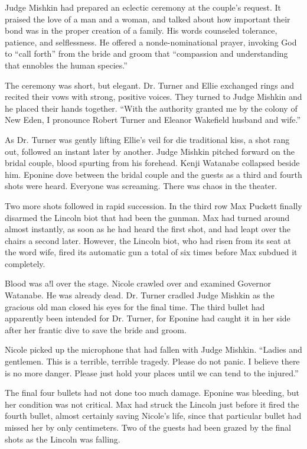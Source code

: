 \documentclass[]{article}
\begin{document}
{Judge Mishkin had prepared an eclectic ceremony at the couple’s request.  It praised the love of a man and a woman, and talked about how important their bond was in the proper creation of a family.  His words counseled tolerance, patience, and selflessness.  He offered a nonde-nominational prayer, invoking God to “call forth” from the bride and groom that “compassion and understanding that ennobles the human species.”

The ceremony was short, but elegant.  Dr.  Turner and Ellie exchanged rings and recited their vows with strong, positive voices.  They turned to Judge Mishkin and he placed their hands together.  “With the authority granted me by the colony of New Eden, I pronounce Robert Turner and Eleanor Wakefield husband and wife.”

As Dr.  Turner was gently lifting Ellie’s veil for die traditional kiss, a shot rang out, followed an instant later by another.  Judge Mishkin pitched forward on the bridal couple, blood spurting from his forehead.  Kenji Watanabe collapsed beside him.  Eponine dove between the bridal couple and the guests as a third and fourth shots were heard.  Everyone was screaming.  There was chaos in the theater.

Two more shots followed in rapid succession.  In the third row Max Puckett finally disarmed the Lincoln biot that had been the gunman.  Max had turned around almost instantly, as soon as he had heard the first shot, and had leapt over the chairs a second later.  However, the Lincoln biot, who had risen from its seat at the word wife, fired its automatic gun a total of six times before Max subdued it completely.

Blood was a!l over the stage.  Nicole crawled over and examined Governor Watanabe.  He was already dead.  Dr.  Turner cradled Judge Mishkin as the gracious old man closed his eyes for the final time.  The third bullet had apparently been intended for Dr.  Turner, for Eponine had caught it in her side after her frantic dive to save the bride and groom.

Nicole picked up the microphone that had fallen with Judge Mishkin.  “Ladies and gentlemen.  This is a terrible, terrible tragedy.  Please do not panic.  I believe there is no more danger.  Please just hold your places until we can tend to the injured.”

The final four bullets had not done too much damage.  Eponine was bleeding, but her condition was not critical.  Max had struck the Lincoln just before it fired the fourth bullet, almost certainly saving Nicole’s life, since that particular bullet had missed her by only centimeters.  Two of the guests had been grazed by the final shots as the Lincoln was falling.

}
\end{document}
